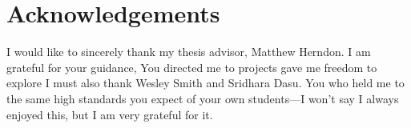 \section{Acknowledgements}

I would like to sincerely thank my thesis advisor, Matthew Herndon.
I am grateful for your guidance, 
You directed me to projects 
gave me freedom to explore 
I must also thank Wesley Smith and Sridhara Dasu.
You who held me to the same high standards you expect of your own 
students---I won't say I always enjoyed this, but I am very grateful for it.
